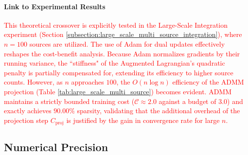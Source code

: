 \documentclass[preprint,12pt,authoryear]{elsarticle}
\begin{document}
\paragraph{Link to Experimental Results}
\textcolor{red}{This theoretical crossover is explicitly tested in the Large-Scale Integration experiment (Section \ref{subsection:large_scale_multi_source_integration}), where $n=100$ sources are utilized. The use of Adam for dual updates effectively reshapes the cost-benefit analysis. Because Adam normalizes gradients by their running variance, the ``stiffness" of the Augmented Lagrangian's quadratic penalty is partially compensated for, extending its efficiency to higher source counts. However, as $n$ approaches $100$, the $O(n \log n)$ efficiency of the ADMM projection (Table \ref{tab:large_scale_multi_source}) becomes evident. ADMM maintains a strictly bounded training cost ($\mathcal{C} \approx 2.0$ against a budget of 3.0) and exactly achieves $90.00\%$ sparsity, validating that the additional overhead of the projection step $C_{\text{proj}}$ is justified by the gain in convergence rate for large $n$.}

\subsection{Numerical Precision}
\end{document}
